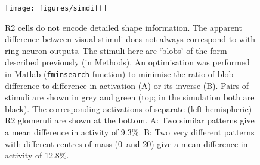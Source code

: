 \begin{figure}
\centering
\texttt{[image: figures/simdiff]}
\caption{R2 cells do not encode detailed shape information.
The apparent difference between visual stimuli does not always correspond to with ring neuron outputs.
The stimuli here are `blobs' of the form described previously (in Methods).
An optimisation was performed in Matlab (\texttt{fminsearch} function) to minimise the ratio of blob difference to difference in activation (A) or its inverse (B).
Pairs of stimuli are shown in grey and green (top; in the simulation both are black).
The corresponding activations of separate (left-hemispheric) R2 glomeruli are shown at the bottom.
A: Two similar patterns give a mean difference in activity of 9.3\%.
B: Two very different patterns with different centres of mass (0\degree\ and 20\degree) give a mean difference in activity of 12.8\%.
}

\label{fig:fcp}
\end{figure}